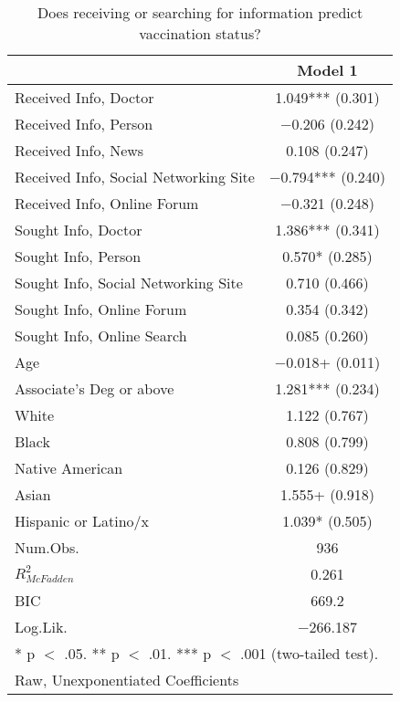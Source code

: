 \begin{table}[ht]

\caption{\label{tab:table-model-3}Does receiving or searching for information predict vaccination status?}
\centering
\begin{tabular}{lc}
\toprule
  & Model 1\\
\midrule
Received Info, Doctor & \num{1.049}*** (\num{0.301})\\
Received Info, Person & \num{-0.206} (\num{0.242})\\
Received Info, News & \num{0.108} (\num{0.247})\\
Received Info, Social Networking Site & \num{-0.794}*** (\num{0.240})\\
Received Info, Online Forum & \num{-0.321} (\num{0.248})\\
Sought Info, Doctor & \num{1.386}*** (\num{0.341})\\
Sought Info, Person & \num{0.570}* (\num{0.285})\\
Sought Info, Social Networking Site & \num{0.710} (\num{0.466})\\
Sought Info, Online Forum & \num{0.354} (\num{0.342})\\
Sought Info, Online Search & \num{0.085} (\num{0.260})\\
Age & \num{-0.018}+ (\num{0.011})\\
Associate's Deg or above & \num{1.281}*** (\num{0.234})\\
White & \num{1.122} (\num{0.767})\\
Black & \num{0.808} (\num{0.799})\\
Native American & \num{0.126} (\num{0.829})\\
Asian & \num{1.555}+ (\num{0.918})\\
Hispanic or Latino/x & \num{1.039}* (\num{0.505})\\
Num.Obs. & \num{936}\\
\midrule
$R_{McFadden}^2$ & \num{0.261}\\
BIC & \num{669.2}\\
Log.Lik. & \num{-266.187}\\
\bottomrule
\multicolumn{2}{l}{\rule{0pt}{1em}* p $<$ .05. ** p $<$ .01. *** p $<$ .001 (two-tailed test).}\\
\multicolumn{2}{l}{\rule{0pt}{1em}Raw, Unexponentiated Coefficients}\\
\end{tabular}
\end{table}